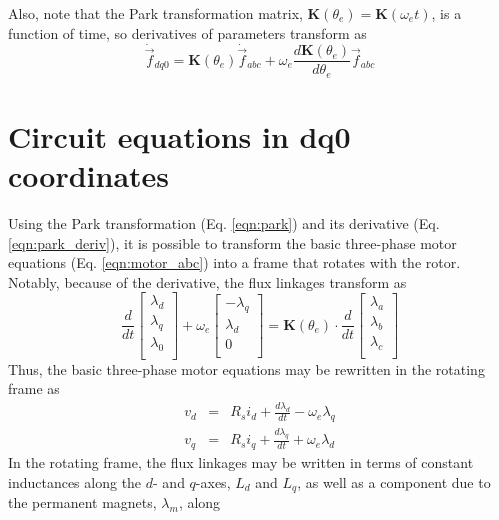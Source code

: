 \documentclass[11pt]{amsart}
\begin{document}
Also, note that the Park transformation matrix,
$\mathbf{K}(\theta_e) = \mathbf{K}(\omega_e t)$, is a function of
time, so derivatives of parameters transform as
%
\begin{equation}
  \label{eqn:park_deriv}
  \dot{\vec{f}}_{dq0} = \mathbf{K}(\theta_e) \dot{\vec{f}}_{abc} +
                        \omega_e \frac{d \mathbf{K}(\theta_e)}{d\theta_e} \vec{f}_{abc}
\end{equation}

\section{Circuit equations in dq0 coordinates}

Using the Park transformation (Eq. \ref{eqn:park}) and its derivative
(Eq. \ref{eqn:park_deriv}), it is possible to transform the basic
three-phase motor equations (Eq. \ref{eqn:motor_abc}) into a frame
that rotates with the rotor.  Notably, because of the derivative, the
flux linkages transform as
%
\begin{equation}
  \frac{d}{dt}
  \begin{bmatrix}
    \lambda_d \\
    \lambda_q \\
    \lambda_0 \\
  \end{bmatrix}
  +
  \omega_e
  \begin{bmatrix}
    -\lambda_q \\
    \lambda_d \\
    0 \\
  \end{bmatrix}
  = \mathbf{K}(\theta_e) \cdot \frac{d}{dt}
  \begin{bmatrix}
    \lambda_a \\
    \lambda_b \\
    \lambda_c \\
  \end{bmatrix}
\end{equation}
%
Thus, the basic three-phase motor equations may be rewritten in the
rotating frame as
%
\begin{eqnarray}
  v_d &=& R_s i_d + \frac{d\lambda_d}{dt} - \omega_e \lambda_q \\
  v_q &=& R_s i_q + \frac{d\lambda_q}{dt} + \omega_e \lambda_d
\end{eqnarray}
%
In the rotating frame, the flux linkages may be written in terms of
constant inductances along the $d$- and $q$-axes, $L_d$ and $L_q$, as
well as a component due to the permanent magnets, $\lambda_m$, along
\end{document}
